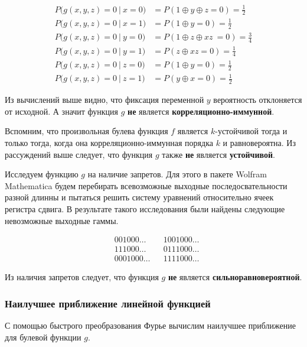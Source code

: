 \documentclass[a4paper,12pt]{article}
\theoremstyle{definition}
\begin{document}
	\begin{align*}
		P\bigl( g(x,y,z) = 0\ |\ x = 0\bigr) &= P(1\oplus y \oplus z = 0) = \frac{1}{2} \\ 
		P\bigl( g(x,y,z) = 0\ |\ x = 1\bigr) &= P(1\oplus y = 0) = \frac{1}{2} \\[2ex]
		P\bigl( g(x,y,z) = 0\ |\ y = 0\bigr) &= P(1 \oplus z \oplus x z\ = 0) = \frac{3}{4} \\ 
		P\bigl( g(x,y,z) = 0\ |\ y = 1\bigr) &= P(z \oplus x z = 0) = \frac{1}{4} \\[2ex]
		P\bigl( g(x,y,z) = 0\ |\ z = 0\bigr) &= P(1 \oplus y = 0) = \frac{1}{2} \\ 
		P\bigl( g(x,y,z) = 0\ |\ z = 1\bigr) &= P(y \oplus x = 0) = \frac{1}{2} 
	\end{align*}
	
	Из вычислений выше видно, что фиксация переменной $y$ вероятность отклоняется от исходной. А значит функция $g$ \textbf{не} является \textbf{корреляционно-иммунной}.

	Вспомним, что произвольная булева функция $f$ является $k$-устойчивой тогда и только тогда, когда она корреляционно-иммунная порядка $k$ и равновероятна. Из рассуждений выше следует, что функция $g$ также \textbf{не} является \textbf{устойчивой}.
	
	Исследуем функцию $g$ на наличие запретов. Для этого в пакете Wolfram Mathematica будем перебирать всевозможные выходные последосвательности разной длинны и пытаться решить систему уравнений относительно ячеек регистра сдвига. В результате такого исследования были найдены следующие невозможные выходные гаммы.
	
	\begin{align*}
		&001000\dots  & &1001000\dots\\
		&111000\dots  & &0111000\dots\\
		&0001000\dots & &1111000\dots 
	\end{align*}

	Из наличия запретов следует, что функция $g$ \textbf{не} является \textbf{сильноравновероятной}.
	

	\subsubsection{Наилучшее приближение линейной функцией} \label{Наилучшее приближение линейной функцией}
	
	С помощью быстрого преобразования Фурье вычислим наилучшее приближение для булевой функции $g$.
	
\end{document}

